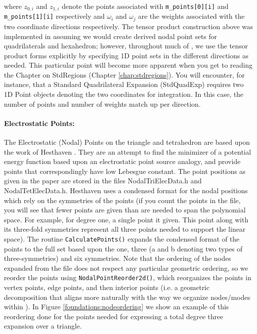 \noindent where $z_{0,i}$ and $z_{1,i}$ denote the points associated with \verb+m_points[0][i]+ and \verb+m_points[1][i]+ respectively
and $\omega_i$ and $\omega_j$ are the weights associated with the two coordinate directions respectively.  The tensor product
construction above was implemented in {\nek} assuming we would create derived nodal point sets for quadrilaterals and hexahedron; however,
throughout much of {\nek}, we use the tensor product forms explicitly by specifying 1D point sets in the different directions as needed.
This particular point will become more apparent when you get to reading the Chapter on StdRegions (Chapter \ref{chap:stdregions}).  You will
encounter, for instance, that a Standard Quadrilateral Expansion (StdQuadExp) requires two 1D Point objects denoting the two 
coordinates for integration.  In this case, the number of points and number of weights match up per direction.


\paragraph{Electrostatic Points: }

The Electrostatic (Nodal) Points on the triangle and tetrahedron are based upon the work 
of Hesthaven \cite{Hesthaven98}.  They are an attempt to find the minimizer of a potential energy function based upon
an electrostatic point source analogy, and provide points that correspondingly have low Lebesgue constant.  The point positions
as given in the paper are stored in the files NodalTriElecData.h and NodalTetElecData.h.  
Hesthaven uses a condensed format for the nodal positions which
rely on the symmetries of the points (if you count the points in the file, you will see that fewer points are given than are needed
to span the polynomial space.  For example, for degree one, a single point it given.   This point along with its three-fold symmetries
represent all three points needed to support the linear space).   The routine \verb+CalculatePoints()+ expands the condensed 
format of the points to the full set based upon the one, three (a and b denoting two types of three-symmetries) 
and six symmetries.  Note that the ordering of the nodes
expanded from the file does not respect any particular geometric ordering, so we reorder the points using \verb+NodalPointReorder2d()+,
which reorganizes the points in vertex points, edge points, and then interior points (i.e. a geometric decomposition that aligns more
naturally with the way we organize nodes/modes within {\nek}).  In Figure \ref{foundations:nodeordering} we show an example
of this reordering done for the points needed for expressing a total degree three expansion over a triangle.

